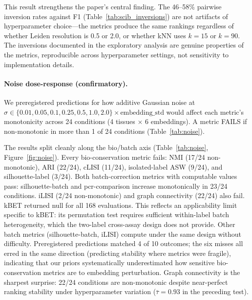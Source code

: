 \documentclass[10pt,letterpaper]{article}
\begin{document}
This result strengthens the paper's central finding. The 46--58\% pairwise inversion rates against F1 (Table~\ref{tab:scib_inversions}) are not artifacts of hyperparameter choice---the metrics produce the same rankings regardless of whether Leiden resolution is 0.5 or 2.0, or whether kNN uses $k = 15$ or $k = 90$. The inversions documented in the exploratory analysis are genuine properties of the metrics, reproducible across hyperparameter settings, not sensitivity to implementation details.

\paragraph{Noise dose-response (confirmatory).} We preregistered predictions for how additive Gaussian noise at $\sigma \in \{0.01, 0.05, 0.1, 0.25, 0.5, 1.0, 2.0\} \times \text{embedding\_std}$ would affect each metric's monotonicity across 24 conditions (4 tissues $\times$ 6 embeddings). A metric FAILS if non-monotonic in more than 1 of 24 conditions (Table~\ref{tab:noise}).

The results split cleanly along the bio/batch axis (Table~\ref{tab:noise}, Figure~\ref{fig:noise}). Every bio-conservation metric fails: NMI (17/24 non-monotonic), ARI (22/24), cLISI (11/24), isolated-label ASW (9/24), and silhouette-label (3/24). Both batch-correction metrics with computable values pass: silhouette-batch and pcr-comparison increase monotonically in 23/24 conditions. iLISI (2/24 non-monotonic) and graph connectivity (22/24) also fail. kBET returned null for all 168 evaluations. This reflects an applicability limit specific to kBET: its permutation test requires sufficient within-label batch heterogeneity, which the two-label cross-assay design does not provide. Other batch metrics (silhouette-batch, iLISI) compute under the same design without difficulty. Preregistered predictions matched 4 of 10 outcomes; the six misses all erred in the same direction (predicting stability where metrics were fragile), indicating that our priors systematically underestimated how sensitive bio-conservation metrics are to embedding perturbation. Graph connectivity is the sharpest surprise: 22/24 conditions are non-monotonic despite near-perfect ranking stability under hyperparameter variation ($\bar{\tau} = 0.93$ in the preceding test).
\end{document}
